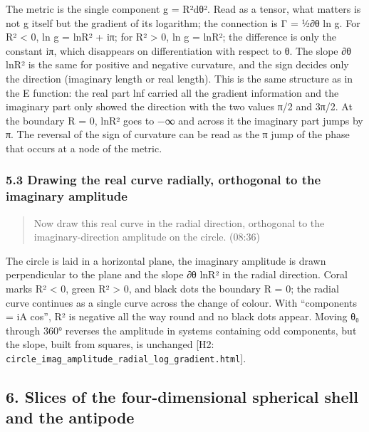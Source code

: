\documentclass[
  a4paper,
]{article}
\begin{document}
The metric is the single component g = R²dθ². Read as a tensor, what
matters is not g itself but the gradient of its logarithm; the
connection is Γ = ½∂θ ln g. For R² \textless{} 0, ln g =
ln\textbar R²\textbar{} + iπ; for R² \textgreater{} 0, ln g =
ln\textbar R²\textbar; the difference is only the constant iπ, which
disappears on differentiation with respect to θ. The slope ∂θ
ln\textbar R²\textbar{} is the same for positive and negative curvature,
and the sign decides only the direction (imaginary length or real
length). This is the same structure as in the E function: the real part
ln\textbar f\textbar{} carried all the gradient information and the
imaginary part only showed the direction with the two values π/2 and
3π/2. At the boundary R = 0, ln\textbar R²\textbar{} goes to −∞ and
across it the imaginary part jumps by π. The reversal of the sign of
curvature can be read as the π jump of the phase that occurs at a node
of the metric.

\subsubsection{5.3 Drawing the real curve radially, orthogonal to the
imaginary
amplitude}\label{drawing-the-real-curve-radially-orthogonal-to-the-imaginary-amplitude}

\begin{quote}
Now draw this real curve in the radial direction, orthogonal to the
imaginary-direction amplitude on the circle. (08:36)
\end{quote}

The circle is laid in a horizontal plane, the imaginary amplitude is
drawn perpendicular to the plane and the slope ∂θ
ln\textbar R²\textbar{} in the radial direction. Coral marks R²
\textless{} 0, green R² \textgreater{} 0, and black dots the boundary R
= 0; the radial curve continues as a single curve across the change of
colour. With ``components = iA cos'', R² is negative all the way round
and no black dots appear. Moving θ₀ through 360° reverses the amplitude
in systems containing odd components, but the slope, built from squares,
is unchanged {[}H2:
\texttt{circle\_\allowbreak{}imag\_\allowbreak{}amplitude\_\allowbreak{}radial\_\allowbreak{}log\_\allowbreak{}gradient.html}{]}.

\subsection{6. Slices of the four-dimensional spherical shell and the
antipode}\label{slices-of-the-four-dimensional-spherical-shell-and-the-antipode}
\end{document}
